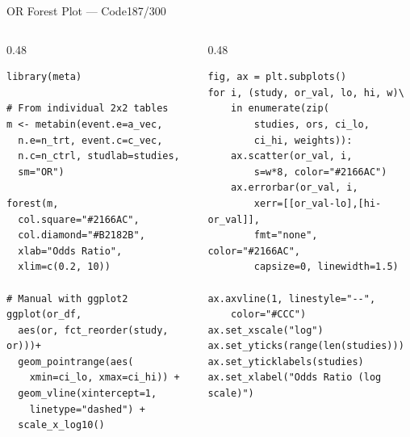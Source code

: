 \documentclass[10pt]{beamer}
\newcommand{\smark}[1]{\hfill{\scriptsize\color{codegray}#1}}
\begin{document}
\begin{frame}[fragile]{OR Forest Plot --- Code}\smark{187/300}
\begin{columns}[T]
\begin{column}{0.48\textwidth}
\begin{lstlisting}[style=Rstyle]
library(meta)

# From individual 2x2 tables
m <- metabin(event.e=a_vec,
  n.e=n_trt, event.c=c_vec,
  n.c=n_ctrl, studlab=studies,
  sm="OR")

forest(m,
  col.square="#2166AC",
  col.diamond="#B2182B",
  xlab="Odds Ratio",
  xlim=c(0.2, 10))

# Manual with ggplot2
ggplot(or_df,
  aes(or, fct_reorder(study, or)))+
  geom_pointrange(aes(
    xmin=ci_lo, xmax=ci_hi)) +
  geom_vline(xintercept=1,
    linetype="dashed") +
  scale_x_log10()
\end{lstlisting}
\end{column}
\begin{column}{0.48\textwidth}
\begin{lstlisting}[style=Pystyle]
fig, ax = plt.subplots()
for i, (study, or_val, lo, hi, w)\
    in enumerate(zip(
        studies, ors, ci_lo,
        ci_hi, weights)):
    ax.scatter(or_val, i,
        s=w*8, color="#2166AC")
    ax.errorbar(or_val, i,
        xerr=[[or_val-lo],[hi-or_val]],
        fmt="none", color="#2166AC",
        capsize=0, linewidth=1.5)

ax.axvline(1, linestyle="--",
    color="#CCC")
ax.set_xscale("log")
ax.set_yticks(range(len(studies)))
ax.set_yticklabels(studies)
ax.set_xlabel("Odds Ratio (log scale)")
\end{lstlisting}
\end{column}
\end{columns}
\end{frame}
\end{document}
